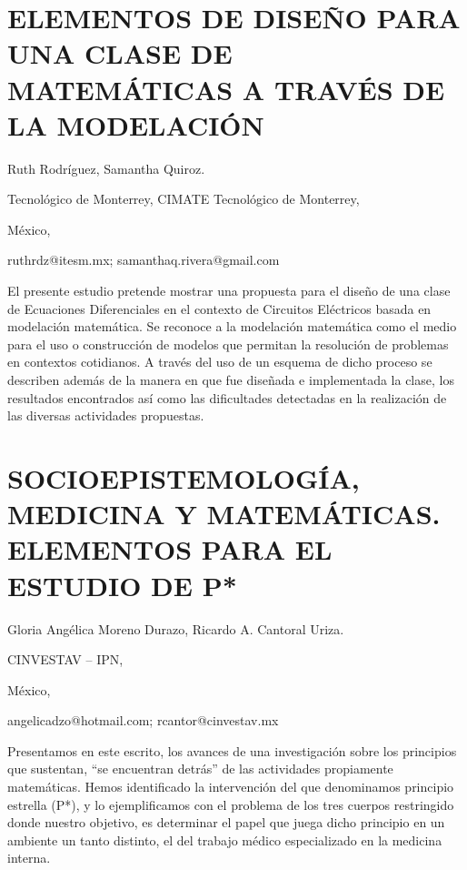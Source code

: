 \section{ELEMENTOS DE DISEÑO PARA UNA CLASE DE MATEMÁTICAS A TRAVÉS DE LA
MODELACIÓN}

\begin{datos}

Ruth Rodríguez, Samantha Quiroz.

Tecnológico de Monterrey, CIMATE Tecnológico de Monterrey, 

México,

ruthrdz@itesm.mx; samanthaq.rivera@gmail.com

\end{datos}

El presente estudio pretende mostrar una propuesta para el diseño
de una clase de Ecuaciones Diferenciales en el contexto de Circuitos
Eléctricos basada en modelación matemática. Se reconoce a la modelación
matemática como el medio para el uso o construcción de modelos que
permitan la resolución de problemas en contextos cotidianos. A través
del uso de un esquema de dicho proceso se describen además de la manera
en que fue diseñada e implementada la clase, los resultados encontrados
así como las dificultades detectadas en la realización de las diversas
actividades propuestas.


\section{SOCIOEPISTEMOLOGÍA, MEDICINA Y MATEMÁTICAS. ELEMENTOS PARA EL ESTUDIO
DE P{*}}

\begin{datos}

Gloria Angélica Moreno Durazo, Ricardo A. Cantoral Uriza.

CINVESTAV – IPN,

México,

angelicadzo@hotmail.com; rcantor@cinvestav.mx

\end{datos}

Presentamos en este escrito, los avances de una investigación sobre
los principios que sustentan, “se encuentran detrás” de las actividades
propiamente matemáticas. Hemos identificado la intervención del que
denominamos principio estrella (P{*}), y lo ejemplificamos con el
problema de los tres cuerpos restringido donde nuestro objetivo, es
determinar el papel que juega dicho principio en un ambiente un tanto
distinto, el del trabajo médico especializado en la medicina interna. 


